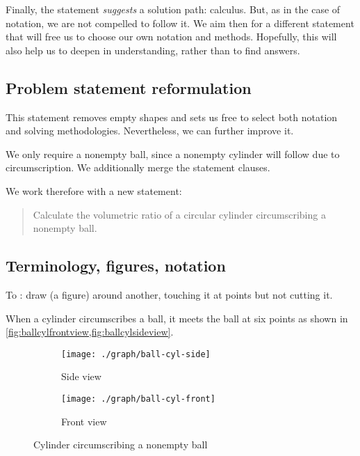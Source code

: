  Finally, the statement \emph{suggests} a solution path: calculus. But, as in the case of notation, we are not compelled to follow it. We aim then for a different statement that will free us to choose our own notation and methods. Hopefully, this will also help us to deepen in understanding, rather than to find  answers.



\subsection{Problem statement reformulation} %
\label{sub:problem_statement_reformulation}
%
  

 This statement removes empty shapes and sets us free to select both notation and solving methodologies. Nevertheless, we can further improve it.

 We only require a nonempty ball, since a nonempty cylinder will follow due to circumscription. We additionally merge the statement clauses.

 We work therefore with a new statement:
%
\begin{quotation}
  Calculate the volumetric ratio of a circular cylinder circumscribing a nonempty ball.
\end{quotation}



\subsection{Terminology, figures, notation} %
\label{sub:terminology_and_notation}

 To : draw (a figure) around another, touching it at points but not cutting it. 

 When a cylinder circumscribes a ball, it meets the ball at six points as shown in \cref{fig:ballcylfrontview,fig:ballcylsideview}.
%
\begin{figure}[b]
  \capstart
  \centering
  \begin{subfigure}[t]{0.3\textwidth}
    \texttt{[image: ./graph/ball-cyl-side]}
    \caption{Side view}
    \label{fig:ballcylfrontview}
  \end{subfigure}
  \qquad\qquad
  \begin{subfigure}[t]{0.3\textwidth}
    \texttt{[image: ./graph/ball-cyl-front]}
    \caption{Front view}
    \label{fig:ballcylsideview}
  \end{subfigure}
  \caption{Cylinder circumscribing a nonempty ball}
  \label{fig:ballcylfrontsideview}
\end{figure}

